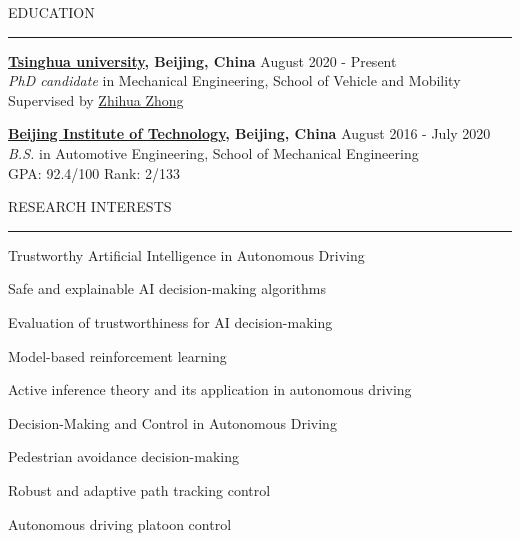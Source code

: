 \documentclass{resume} %
\renewenvironment{rSection}[1]{
\sectionskip
\textcolor{TsinghuaPurple}{\MakeUppercase{#1}}
\sectionlineskip
\hrule
\begin{list}{}{
\setlength{\leftmargin}{0em}
}
\item[]
}{
\end{list}
}
\begin{document}
  


\begin{rSection}{Education}

{\bf \href{https://www.tsinghua.edu.cn/en/}{Tsinghua university}, Beijing, China} \hfill {August 2020 - Present}
\\ 
\textit{PhD candidate} in Mechanical Engineering, School of Vehicle and Mobility
\\
Supervised by \href{https://en.wikipedia.org/wiki/Zhong_Zhihua}{Zhihua Zhong} 

{\bf \href{https://english.bit.edu.cn/}{Beijing Institute of Technology}, Beijing, China} \hfill {August 2016 - July 2020}
\\ 
\textit{B.S.} in Automotive Engineering, School of Mechanical Engineering
\\
GPA: 92.4/100 Rank: 2/133



\end{rSection} 


\begin{rSection}{Research INTERESTS}

\begin{rSubsection}{Trustworthy Artificial Intelligence in Autonomous Driving}{}{}

\item Safe and explainable AI decision-making algorithms
\item Evaluation of trustworthiness for AI decision-making
\item Model-based reinforcement learning 
\item Active inference theory and its application in autonomous driving
\end{rSubsection}  

\begin{rSubsection}{Decision-Making and Control in Autonomous Driving}{}{}

\item Pedestrian avoidance decision-making
\item Robust and adaptive path tracking control  
\item Autonomous driving platoon control
\end{rSubsection}  


\end{rSection}
\end{document}
